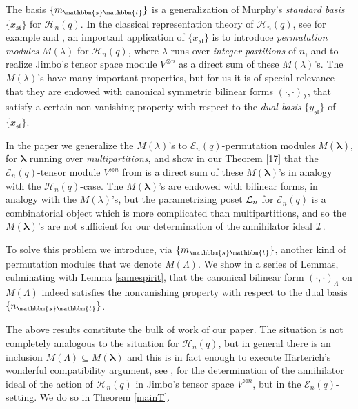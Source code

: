 \documentclass[10pt,a4,twoside,hidelinks,rm]{article}
\newcommand\es{\mathbbm{s}}
\newcommand\et{\mathbbm{t}}
\newcommand{\s}{\mathfrak{s}}
\newcommand{\T}{\mathfrak{t}}
\newcommand{\HH}{ \mathcal{H}_n(q)}
\newcommand{\E}{ {\mathcal E}_n(q)}
\newcommand\blambda{{\boldsymbol\lambda}}
\theoremstyle{plain}
\begin{document}
\medskip
The basis $ \{m_{\es \et} \} $ is a generalization of Murphy's 
\textit{standard basis} $ \{ x_{\s \T}\}$ for $ \HH$. 
In the classical representation theory of $ \HH $, see for example \cite{DJ} and \cite{DJM}, 
an important application of $\{ x_{\s\T}\}$ is to
introduce \textit{permutation modules} $ M(\lambda) $ for $ \HH$, where $ \lambda $ runs over 
\textit{integer partitions} of $ n $, and to realize Jimbo's tensor space module $ V^{\otimes n} $
as a direct sum of these $ M(\lambda)$'s. The $ M(\lambda)$'s
have many important properties, but for us it is of special relevance 
that they are endowed with canonical symmetric
bilinear forms $ (\cdot, \cdot)_{\lambda}$, that
satisfy a certain non-vanishing property with
respect to the \textit{dual basis} $ \{ y_{\s \T}\}$ of $ \{ x_{\s \T}\}$.



\medskip
In the paper we generalize
the $ M(\lambda) $'s to $ \E$-permutation modules $ M(\blambda) $, for $ \blambda $
running over \textit{multipartitions}, 
and show in our Theorem \ref{17}
that the $ \E$-tensor module $ V^{\otimes n} $ from \cite{Ry} is 
a direct sum of these $ M(\blambda) $'s in analogy with the $ \HH$-case. 
The $ M(\blambda) $'s are endowed with bilinear forms, in analogy with the $ M(\lambda)$'s, 
but the parametrizing poset $ {\cal L}_n $ for $ \E $ is a combinatorial object
which is more complicated than 
multipartitions, 
and so the $ M(\blambda) $'s are not sufficient for our determination of
the annihilator ideal
$ \cal I$.





\medskip
To solve this problem we introduce, via $ \{ m_{\es \et}\}  $, another kind of permutation modules
that we denote
$ M(\Lambda)$. 
We show
in a series of Lemmas, culminating with Lemma
\ref{samespirit}, 
that the canonical 
bilinear form
$ (\cdot, \cdot)_{\Lambda}$ on $ M(\Lambda)$
indeed satisfies the nonvanishing property
with respect to the dual basis $ \{ n_{\es \et}\}$. 




\medskip
The above results constitute the bulk of work of our paper.
The situation is not completely analogous to the situation 
for $ \HH$, 
but in general there is an inclusion $ M(\Lambda) \subseteq M(\blambda) $ 
and this is in fact enough 
to execute 
H\"arterich's wonderful compatibility argument, see \cite{Har}, for the determination of the annihilator ideal of the action
of $ \HH $ in Jimbo's tensor space $ V^{\otimes n} $, but in the $\E$-setting. We do so in Theorem \ref{mainT}. 
\end{document}
